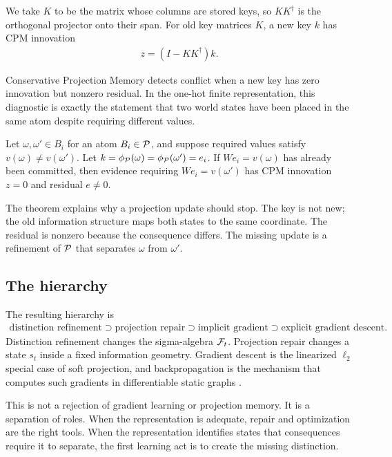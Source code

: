We take $K$ to be the matrix whose columns are stored keys, so $KK^\dagger$ is the orthogonal projector onto their span. For old key matrices $K$, a new key $k$ has CPM innovation
\begin{align*}
z=(I-KK^\dagger)k.
\end{align*}

Conservative Projection Memory detects conflict when a new key has zero innovation but nonzero residual. In the one-hot finite representation, this diagnostic is exactly the statement that two world states have been placed in the same atom despite requiring different values.

\begin{theorem}
\label{thm:cpm-conflict-distinction:informal}
Let $\omega,\omega'\in B_i$ for an atom $B_i\in\mathcal{P}$, and suppose required values satisfy $v(\omega)\ne v(\omega')$. Let $k=\phi_{\mathcal{P}}(\omega)=\phi_{\mathcal{P}}(\omega')=e_i$. If $We_i=v(\omega)$ has already been committed, then evidence requiring $We_i=v(\omega')$ has CPM innovation $z=0$ and residual $e\ne0$.
\end{theorem}

The theorem explains why a projection update should stop. The key is not new; the old information structure maps both states to the same coordinate. The residual is nonzero because the consequence differs. The missing update is a refinement of $\mathcal{P}$ that separates $\omega$ from $\omega'$.

\subsection{The hierarchy}

The resulting hierarchy is
\begin{align*}
\text{distinction refinement}\supset \text{projection repair}\supset \text{implicit gradient}\supset \text{explicit gradient descent}.
\end{align*}
Distinction refinement changes the sigma-algebra $\mathcal{F}_t$. Projection repair changes a state $s_t$ inside a fixed information geometry. Gradient descent is the linearized $\ell_2$ special case of soft projection, and backpropagation is the mechanism that computes such gradients in differentiable static graphs \citep{rumelhart1986learning}.

This is not a rejection of gradient learning or projection memory. It is a separation of roles. When the representation is adequate, repair and optimization are the right tools. When the representation identifies states that consequences require it to separate, the first learning act is to create the missing distinction.
